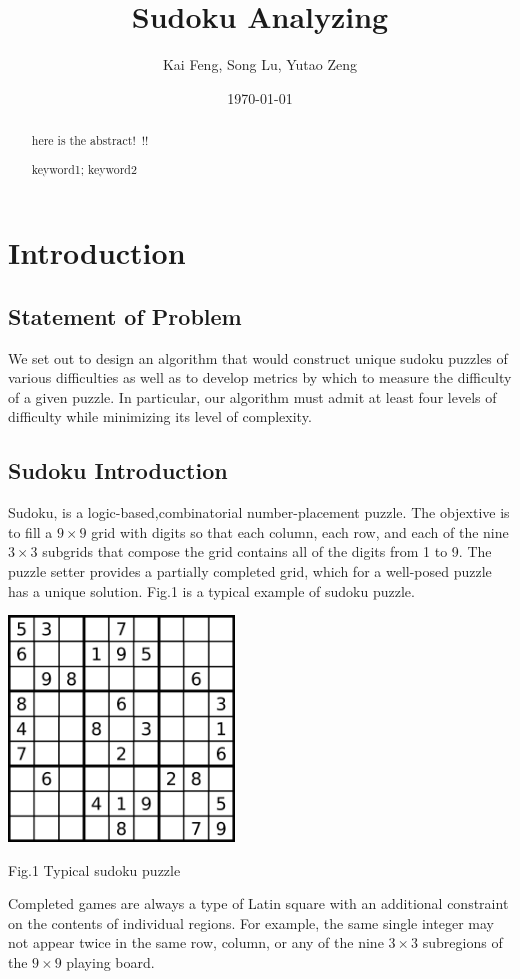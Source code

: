 \documentclass{mcmthesis}
\title{Sudoku Analyzing}
\author{Kai Feng, Song Lu, Yutao Zeng }
\date{\today}
\begin{document}
\begin{abstract}
here is the abstract!~!!
\begin{keywords}
keyword1; keyword2
\end{keywords}
\end{abstract}
\maketitle

\section{Introduction}
\subsection{Statement of Problem}
We set out to design an algorithm that would construct unique sudoku puzzles of various difficulties as well as to develop metrics by which to measure the difficulty of a given puzzle. In particular, our algorithm must admit at least four levels of difficulty while minimizing its level of complexity.\\
\subsection{Sudoku Introduction}
Sudoku, is a logic-based,combinatorial number-placement puzzle. The objextive is to fill a $9\times9$ grid with digits so that each column, each row, and each of the nine $3\times3$ subgrids that compose the grid contains all of the digits from 1 to 9. The puzzle setter provides a partially completed grid, which for a well-posed puzzle has a unique solution. Fig.1 is a typical example of sudoku puzzle.\\
\centerline{
\includegraphics[width = 6cm]{figures/sudoku.png}
}
\centerline{Fig.1 Typical sudoku puzzle}
\indent Completed games are always a type of Latin square with an additional constraint on the contents of individual regions. For example, the same single integer may not appear twice in the same row, column, or any of the nine $3\times3$ subregions of the $9\times9$ playing board.\newline
\end{document}
